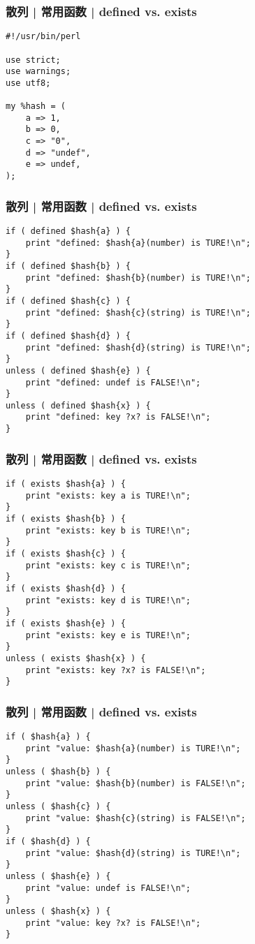 \begin{frame}[fragile]
  \frametitle{散列 | \alert{常用函数} | defined vs. exists}
\begin{lstlisting}
#!/usr/bin/perl 

use strict;
use warnings;
use utf8;

my %hash = (
    a => 1,
    b => 0,
    c => "0",
    d => "undef",
    e => undef,
);
\end{lstlisting}
\end{frame}

\begin{frame}[fragile]
  \frametitle{散列 | \alert{常用函数} | defined vs. exists}
\begin{lstlisting}[basicstyle=\small\tt]
if ( defined $hash{a} ) {
    print "defined: $hash{a}(number) is TURE!\n";
}
if ( defined $hash{b} ) {
    print "defined: $hash{b}(number) is TURE!\n";
}
if ( defined $hash{c} ) {
    print "defined: $hash{c}(string) is TURE!\n";
}
if ( defined $hash{d} ) {
    print "defined: $hash{d}(string) is TURE!\n";
}
unless ( defined $hash{e} ) {
    print "defined: undef is FALSE!\n";
}
unless ( defined $hash{x} ) {
    print "defined: key ?x? is FALSE!\n";
}
\end{lstlisting}
\end{frame}

\begin{frame}[fragile]
  \frametitle{散列 | \alert{常用函数} | defined vs. exists}
\begin{lstlisting}[basicstyle=\small\tt]
if ( exists $hash{a} ) {
    print "exists: key a is TURE!\n";
}
if ( exists $hash{b} ) {
    print "exists: key b is TURE!\n";
}
if ( exists $hash{c} ) {
    print "exists: key c is TURE!\n";
}
if ( exists $hash{d} ) {
    print "exists: key d is TURE!\n";
}
if ( exists $hash{e} ) {
    print "exists: key e is TURE!\n";
}
unless ( exists $hash{x} ) {
    print "exists: key ?x? is FALSE!\n";
}
\end{lstlisting}
\end{frame}

\begin{frame}[fragile]
  \frametitle{散列 | \alert{常用函数} | defined vs. exists}
\begin{lstlisting}[basicstyle=\small\tt]
if ( $hash{a} ) {
    print "value: $hash{a}(number) is TURE!\n";
}
unless ( $hash{b} ) {
    print "value: $hash{b}(number) is FALSE!\n";
}
unless ( $hash{c} ) {
    print "value: $hash{c}(string) is FALSE!\n";
}
if ( $hash{d} ) {
    print "value: $hash{d}(string) is TURE!\n";
}
unless ( $hash{e} ) {
    print "value: undef is FALSE!\n";
}
unless ( $hash{x} ) {
    print "value: key ?x? is FALSE!\n";
}
\end{lstlisting}
\end{frame}


